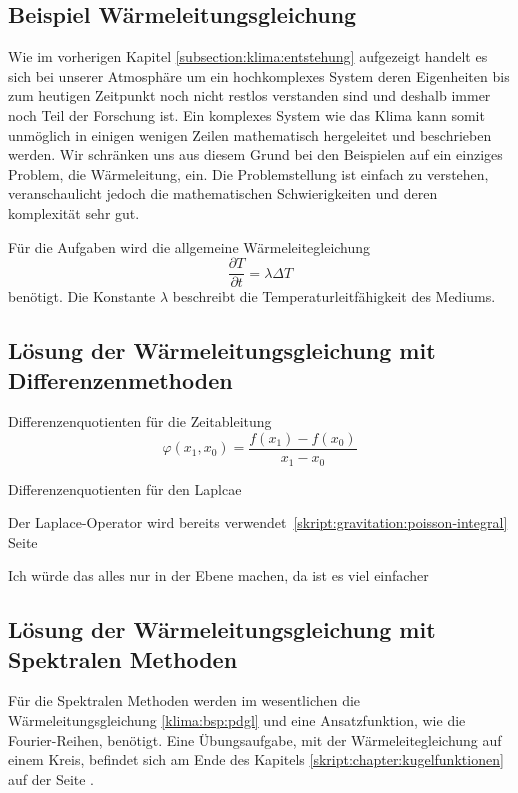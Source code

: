 \begin{refsection}
\subsection{Beispiel Wärmeleitungsgleichung}
Wie im vorherigen Kapitel \ref{subsection:klima:entstehung}  aufgezeigt handelt es sich bei unserer Atmosphäre um ein hochkomplexes System deren Eigenheiten bis zum heutigen Zeitpunkt noch nicht restlos verstanden sind und deshalb immer noch Teil der Forschung ist. Ein komplexes System wie das Klima kann somit unmöglich in einigen wenigen Zeilen mathematisch hergeleitet und beschrieben werden. Wir schränken uns aus diesem Grund bei den Beispielen auf ein einziges Problem, die Wärmeleitung, ein. Die Problemstellung ist einfach zu verstehen, veranschaulicht jedoch die mathematischen Schwierigkeiten und deren komplexität sehr gut.

Für die Aufgaben wird die allgemeine Wärmeleitegleichung
\begin{equation}
\frac{\partial T}{\partial t} =  \lambda \Delta T 
\label{klima:bsp:pdgl}
\end{equation}
benötigt. Die Konstante $\lambda$ beschreibt die Temperaturleitfähigkeit des Mediums.



\subsection{Lösung der Wärmeleitungsgleichung mit Differenzenmethoden}
Differenzenquotienten für die Zeitableitung
\begin{equation}
\varphi(x_1,x_0) = \frac{f(x_1)-f(x_0)}{x_1-x_0}
\end{equation}



Differenzenquotienten für den Laplcae


Der Laplace-Operator wird bereits verwendet~\eqref{skript:gravitation:poisson-integral}
Seite \pageref{skript:gravitation:poisson-integral}

Ich würde das alles nur in der Ebene machen, da ist es viel einfacher










\subsection{Lösung der Wärmeleitungsgleichung mit Spektralen Methoden}
Für die Spektralen Methoden werden im wesentlichen die Wärmeleitungsgleichung \eqref{klima:bsp:pdgl}
und eine Ansatzfunktion, wie die Fourier-Reihen, benötigt.
Eine Übungsaufgabe, mit der Wärmeleitegleichung auf einem Kreis, befindet sich am Ende des Kapitels \ref{skript:chapter:kugelfunktionen}  auf der Seite \pageref{skript:1101:pdgl}.


\end{refsection}
